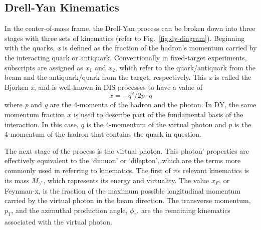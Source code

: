 \subsection{Drell-Yan Kinematics}

In the center-of-mass frame, the Drell-Yan process can be broken down into three stages with three sets of kinematics (refer to Fig.~\ref{fig:dy-diagram}). Beginning with the quarks, \emph{x} is defined as the fraction of the hadron's momentum carried by the interacting quark or antiquark. Conventionally in fixed-target experiments, subscripts are assigned as $x_1$ and $x_2$, which refer to the quark/antiquark from the beam and the antiquark/quark from the target, respectively. This \emph{x} is called the Bjorken \emph{x}, and is well-known in DIS processes to have a value of
\begin{equation}
x = -q^2/2 p \cdot q
\end{equation} where \emph{p} and \emph{q} are the 4-momenta of the hadron and the photon. In DY, the same momentum fraction $x$ is used to describe part of the fundamental basis of the interaction. In this case, $q$ is the 4-momentum of the virtual photon and $p$ is the 4-momentum of the hadron that contains the quark in question.

The next stage of the process is the virtual photon. This photon' properties are effectively equivalent to the `dimuon' or `dilepton', which are the terms more commonly used in referring to kinematics. The first of its relevant kinematics is its mass $M_{\gamma^*}$, which represents its energy and virtuality. The value $x_F$, or Feynman-x, is the fraction of the maximum possible longitudinal momentum carried by the virtual photon in the beam direction. The transverse momentum, $p_T$, and the azimuthal production angle, $\phi_{\gamma^*}$ are the remaining kinematics associated with the virtual photon.

